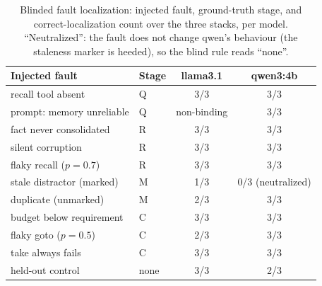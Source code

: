 \documentclass{article}
\begin{document}
\begin{table}[h]
\caption{Blinded fault localization: injected fault, ground-truth
stage, and correct-localization count over the three stacks, per
model. ``Neutralized'': the fault does not change qwen's behaviour
(the staleness marker is heeded), so the blind rule reads ``none''.}
\label{p1:tab:meta-eval}
\centering
\small
\begin{tabular}{llcc}
\toprule
Injected fault & Stage & llama3.1 & qwen3:4b \\
\midrule
recall tool absent        & Q & 3/3 & 3/3 \\
prompt: memory unreliable & Q & non-binding & 3/3 \\
fact never consolidated   & R & 3/3 & 3/3 \\
silent corruption         & R & 3/3 & 3/3 \\
flaky recall ($p{=}0.7$)  & R & 3/3 & 3/3 \\
stale distractor (marked) & M & 1/3 & 0/3 (neutralized) \\
duplicate (unmarked)      & M & 2/3 & 3/3 \\
budget below requirement  & C & 3/3 & 3/3 \\
flaky goto ($p{=}0.5$)    & C & 2/3 & 3/3 \\
take always fails         & C & 3/3 & 3/3 \\
\midrule
held-out control          & none & 3/3 & 2/3 \\
\bottomrule
\end{tabular}
\end{table}
\end{document}

